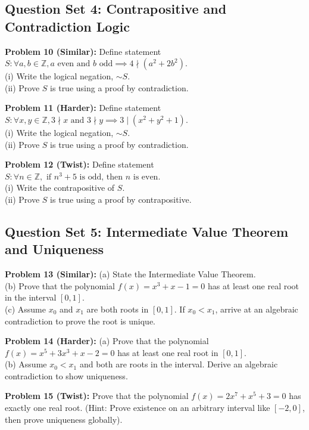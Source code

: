 \documentclass{article}
\begin{document}
\subsection{Question Set 4: Contrapositive and Contradiction Logic}
\noindent\textbf{Problem 10 (Similar):} Define statement $S: \forall a,b \in \mathbb{Z}, a \text{ even and } b \text{ odd} \implies 4 \nmid (a^2 + 2b^2)$. \\
(i) Write the logical negation, $\sim S$. \\
(ii) Prove $S$ is true using a proof by contradiction.

\noindent\textbf{Problem 11 (Harder):} Define statement $S: \forall x,y \in \mathbb{Z}, 3 \nmid x \text{ and } 3 \nmid y \implies 3 \mid (x^2 + y^2 + 1)$. \\
(i) Write the logical negation, $\sim S$. \\
(ii) Prove $S$ is true using a proof by contradiction.

\noindent\textbf{Problem 12 (Twist):} Define statement $S: \forall n \in \mathbb{Z}, \text{ if } n^3 + 5 \text{ is odd, then } n \text{ is even}$. \\
(i) Write the contrapositive of $S$. \\
(ii) Prove $S$ is true using a proof by contrapositive.

\subsection{Question Set 5: Intermediate Value Theorem and Uniqueness}
\noindent\textbf{Problem 13 (Similar):} 
(a) State the Intermediate Value Theorem. \\
(b) Prove that the polynomial $f(x) = x^3 + x - 1 = 0$ has at least one real root in the interval $[0,1]$. \\
(c) Assume $x_0$ and $x_1$ are both roots in $[0,1]$. If $x_0 < x_1$, arrive at an algebraic contradiction to prove the root is unique.

\noindent\textbf{Problem 14 (Harder):} 
(a) Prove that the polynomial $f(x) = x^5 + 3x^3 + x - 2 = 0$ has at least one real root in $[0,1]$. \\
(b) Assume $x_0 < x_1$ and both are roots in the interval. Derive an algebraic contradiction to show uniqueness.

\noindent\textbf{Problem 15 (Twist):} 
Prove that the polynomial $f(x) = 2x^7 + x^5 + 3 = 0$ has exactly one real root. (Hint: Prove existence on an arbitrary interval like $[-2, 0]$, then prove uniqueness globally).
\end{document}
